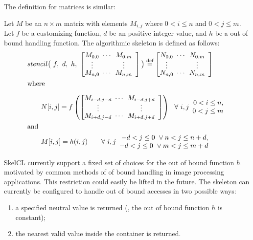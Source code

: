 \noindent
The definition for matrices is similar:
\begin{definition}
  \label{definition:mapoverlap:matrix}
  Let $M$ be an $n\times m$ matrix with elements $M_{i,j}$ where $0 < i \leq n$ and $0 < j \leq m$.
  Let $f$ be a customizing function, $d$ be an positive integer value, and $h$ be a out of bound handling function.
  The algorithmic skeleton \stencil is defined as follows:
  \begin{equation*}
    \begin{split}
    & stencil \big(\ f,\  d,\ h,\ \DottedMatrix{M_{0,0}}{M_{0,m}}{M_{n,0}}{M_{n,m}}\big)
               \eqdef \DottedMatrix{N_{0,0}}{N_{0,m}}{N_{n,0}}{N_{n,m}}\\
               &\text{where}\\[.5em]
    &\qquad N[i,j] = f\left(\DottedMatrix{M_{i-d,j-d}}{M_{i-d,j+d}}{M_{i+d,j-d}}{M_{i+d,j+d}}\right)\ \ \forall\ i,j
        \begin{array}{r} 0 < i \leq n,\\ 0 < j \leq m \end{array}\\
        &\text{and}\\
    &\qquad M[i,j] = h(i,j) \qquad \forall\ i,j \begin{array}{r} -d < j \leq 0\ \vee n < j \leq n+d,\\ -d < j \leq 0\ \vee m < j \leq m+d \end{array}
    \end{split}
  \end{equation*}
\end{definition}


SkelCL currently support a fixed set of choices for the out of bound function $h$ motivated by common methods of of bound handling in image processing applications.
This restriction could easily be lifted in the future.
The \stencil skeleton can currently be configured to handle out of bound accesses in two possible ways:
\begin{enumerate}
  \item a specified neutral value is returned (\ie, the out of bound function $h$ is constant);
  \item the nearest valid value inside the container is returned.
\end{enumerate}

